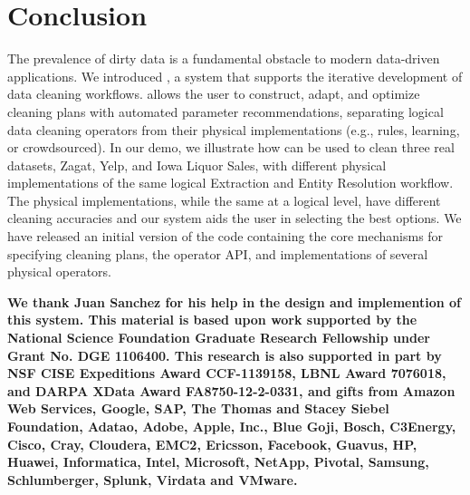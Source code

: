 \section{Conclusion}
The prevalence of dirty data is a fundamental obstacle to modern data-driven applications.
We introduced \sys, a system that supports the iterative development of data cleaning workflows.
\sys allows the user to construct, adapt, and optimize cleaning plans with automated parameter recommendations, separating logical data cleaning operators from their physical implementations (e.g., rules, learning, or crowdsourced).
In our demo, we illustrate how \sys can be used to clean three real datasets, Zagat, Yelp, and Iowa Liquor Sales, with different physical implementations of the same logical Extraction and Entity Resolution workflow.
The physical implementations, while the same at a logical level, have different cleaning accuracies and our system aids the user in selecting the best options.
We have released an initial version of the code containing the core mechanisms for specifying cleaning plans, the operator API, and implementations of several physical operators.

\vspace{0.5em}

\scriptsize\textbf{We thank Juan Sanchez for his help in the design and implemention of this system. This material is based upon work supported by the National Science Foundation Graduate Research Fellowship under Grant No. DGE 1106400. This research is also supported in part by NSF CISE Expeditions Award CCF-1139158, LBNL Award 7076018, and DARPA XData Award FA8750-12-2-0331, and gifts from Amazon Web Services, Google, SAP, The Thomas and Stacey Siebel Foundation, Adatao, Adobe, Apple, Inc., Blue Goji, Bosch, C3Energy, Cisco, Cray, Cloudera, EMC2, Ericsson, Facebook, Guavus, HP, Huawei, Informatica, Intel, Microsoft, NetApp, Pivotal, Samsung, Schlumberger, Splunk, Virdata and VMware.}